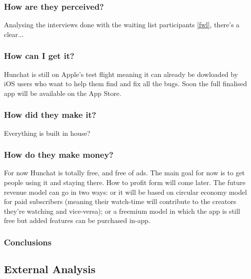 \documentclass[12pt]{article}
\begin{document}
	\subsubsection{How are they perceived?}
Analysing the interviews done with the waiting list participants \ref{fwl}, there's a clear...

	\subsubsection{How can I get it?}
Hunchat is still on Apple's test flight meaning it can already be dowloaded by iOS users who want to help them find and fix all the bugs. Soon the full finalised app will be available on the App Store.

	\subsubsection{How did they make it?}
Everything is built in house?

	\subsubsection{How do they make money?}
For now Hunchat is totally free, and free of ads. The main goal for now is to get people using it and staying there. How to profit form will come later. The future revenue model can go in two ways: or it will be based on circular economy model for paid subscribers (meaning their watch-time will contribute to the creators they're watching and vice-versa); or a freemium model in which the app is still free but added features can be purchased in-app.

	\subsubsection{Conclusions}

\subsection{External Analysis}
	
\end{document}
